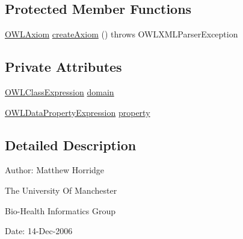 \subsection*{Protected Member Functions}
\begin{DoxyCompactItemize}
\item 
\hyperlink{interfaceorg_1_1semanticweb_1_1owlapi_1_1model_1_1_o_w_l_axiom}{O\-W\-L\-Axiom} \hyperlink{classorg_1_1coode_1_1owlapi_1_1owlxmlparser_1_1_o_w_l_data_property_domain_axiom_element_handler_aa14ae0377f8356e82525aa069d306fac}{create\-Axiom} ()  throws O\-W\-L\-X\-M\-L\-Parser\-Exception 
\end{DoxyCompactItemize}
\subsection*{Private Attributes}
\begin{DoxyCompactItemize}
\item 
\hyperlink{interfaceorg_1_1semanticweb_1_1owlapi_1_1model_1_1_o_w_l_class_expression}{O\-W\-L\-Class\-Expression} \hyperlink{classorg_1_1coode_1_1owlapi_1_1owlxmlparser_1_1_o_w_l_data_property_domain_axiom_element_handler_a80a47a35c83f49ea71797b63af55d321}{domain}
\item 
\hyperlink{interfaceorg_1_1semanticweb_1_1owlapi_1_1model_1_1_o_w_l_data_property_expression}{O\-W\-L\-Data\-Property\-Expression} \hyperlink{classorg_1_1coode_1_1owlapi_1_1owlxmlparser_1_1_o_w_l_data_property_domain_axiom_element_handler_a5906cb0c3f3ce9051f78f1f23dac14cf}{property}
\end{DoxyCompactItemize}


\subsection{Detailed Description}
Author\-: Matthew Horridge\par
 The University Of Manchester\par
 Bio-\/\-Health Informatics Group\par
 Date\-: 14-\/\-Dec-\/2006\par
\par
 

